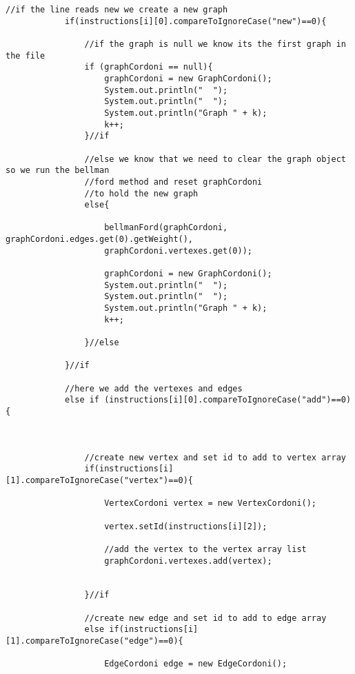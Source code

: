 \documentclass[letterpaper, 10pt,DIV=13]{scrartcl}
\numberwithin{equation}{section} %
\numberwithin{figure}{section} %
\numberwithin{table}{section} %
\begin{document}
\begin{lstlisting}[frame=single, ]
            //if the line reads new we create a new graph
            if(instructions[i][0].compareToIgnoreCase("new")==0){
                
                //if the graph is null we know its the first graph in the file
                if (graphCordoni == null){
                    graphCordoni = new GraphCordoni();
                    System.out.println("  ");
                    System.out.println("  ");
                    System.out.println("Graph " + k);
                    k++;
                }//if
                
                //else we know that we need to clear the graph object so we run the bellman 
                //ford method and reset graphCordoni
                //to hold the new graph
                else{

                    bellmanFord(graphCordoni, graphCordoni.edges.get(0).getWeight(),  
                    graphCordoni.vertexes.get(0));

                    graphCordoni = new GraphCordoni();
                    System.out.println("  ");
                    System.out.println("  ");
                    System.out.println("Graph " + k);
                    k++;

                }//else

            }//if

            //here we add the vertexes and edges
            else if (instructions[i][0].compareToIgnoreCase("add")==0){

                

                //create new vertex and set id to add to vertex array
                if(instructions[i][1].compareToIgnoreCase("vertex")==0){

                    VertexCordoni vertex = new VertexCordoni();

                    vertex.setId(instructions[i][2]);
                        
                    //add the vertex to the vertex array list
                    graphCordoni.vertexes.add(vertex);
                    
                    
                }//if
                
                //create new edge and set id to add to edge array
                else if(instructions[i][1].compareToIgnoreCase("edge")==0){
        
                    EdgeCordoni edge = new EdgeCordoni();


\end{lstlisting}
\end{document}
